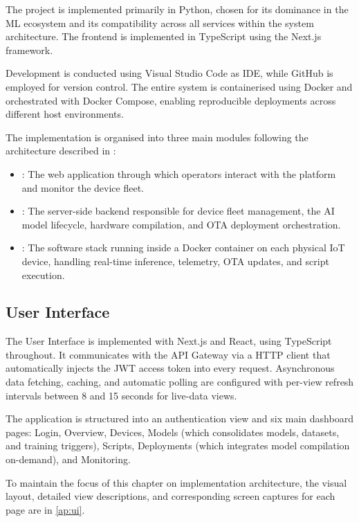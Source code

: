 The project is implemented primarily in Python, chosen for its dominance in the \gls{ML} ecosystem and its compatibility across all services within the system architecture. The frontend is implemented in TypeScript using the Next.js framework. 

Development is conducted using Visual Studio Code as \gls{IDE}, while GitHub is employed for version control. The entire system is containerised using Docker and orchestrated with Docker Compose, enabling reproducible deployments across different host environments.

The implementation is organised into three main modules following the architecture described in :

\begin{itemize}
    \item \textbf{}: The web application through which operators interact with the platform and monitor the device fleet.
    \item \textbf{}: The server-side backend responsible for device fleet management, the \gls{AI} model lifecycle, hardware compilation, and \gls{OTA} deployment orchestration.
    \item \textbf{}: The software stack running inside a Docker container on each physical \gls{IoT} device, handling real-time inference, telemetry, \gls{OTA} updates, and script execution.
\end{itemize}

\subsection{User Interface}\label{sec:impl:frontend}

The User Interface is implemented with Next.js and React, using TypeScript throughout. It communicates with the \gls{API} Gateway via a \gls{HTTP} client that automatically injects the \gls{JWT} access token into every request. Asynchronous data fetching, caching, and automatic polling are configured with per-view refresh intervals between 8 and 15 seconds for live-data views.

The application is structured into an authentication view and six main dashboard pages: Login, Overview, Devices, Models (which consolidates models, datasets, and training triggers), Scripts, Deployments (which integrates model compilation on-demand), and Monitoring.

To maintain the focus of this chapter on implementation architecture, the visual layout, detailed view descriptions, and corresponding screen captures for each page are in \autoref{ap:ui}.


